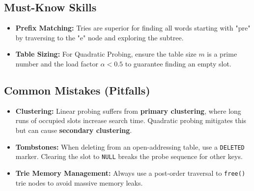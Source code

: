 \subsection{Must-Know Skills}
\begin{itemize}
    \item \textbf{Prefix Matching:} Tries are superior for finding all words starting with "pre" by traversing to the "e" node and exploring the subtree.
    \item \textbf{Table Sizing:} For Quadratic Probing, ensure the table size $m$ is a prime number and the load factor $\alpha < 0.5$ to guarantee finding an empty slot.
\end{itemize}

\subsection{Common Mistakes (Pitfalls)}
\begin{remark}
\begin{itemize}
    \item \textbf{Clustering:} Linear probing suffers from \textbf{primary clustering}, where long runs of occupied slots increase search time. Quadratic probing mitigates this but can cause \textbf{secondary clustering}.
    \item \textbf{Tombstones:} When deleting from an open-addressing table, use a \texttt{DELETED} marker. Clearing the slot to \texttt{NULL} breaks the probe sequence for other keys.
    \item \textbf{Trie Memory Management:} Always use a post-order traversal to \texttt{free()} trie nodes to avoid massive memory leaks.
\end{itemize}
\end{remark}
